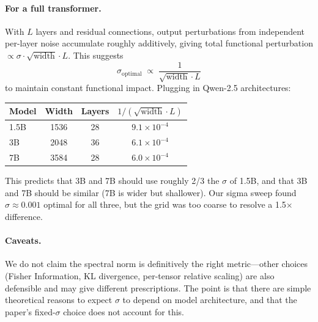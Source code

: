 \documentclass[11pt]{article}
\begin{document}
\paragraph{For a full transformer.} With $L$ layers and residual connections, output perturbations from independent per-layer noise accumulate roughly additively, giving total functional perturbation $\propto\sigma\cdot\sqrt{\text{width}}\cdot L$. This suggests
\[
  \sigma_{\text{optimal}} \;\propto\; \frac{1}{\sqrt{\text{width}}\cdot L}
\]
to maintain constant functional impact. Plugging in Qwen-2.5 architectures:

\begin{center}
\small
\begin{tabular}{lccc}
\toprule
Model & Width & Layers & $1/(\sqrt{\text{width}}\cdot L)$ \\
\midrule
1.5B & 1536 & 28 & $9.1\times 10^{-4}$ \\
3B   & 2048 & 36 & $6.1\times 10^{-4}$ \\
7B   & 3584 & 28 & $6.0\times 10^{-4}$ \\
\bottomrule
\end{tabular}
\end{center}

This predicts that 3B and 7B should use roughly 2/3 the $\sigma$ of 1.5B, and that 3B and 7B should be similar (7B is wider but shallower). Our sigma sweep found $\sigma\approx 0.001$ optimal for all three, but the grid was too coarse to resolve a 1.5$\times$ difference.

\paragraph{Caveats.} We do not claim the spectral norm is definitively the right metric---other choices (Fisher Information, KL divergence, per-tensor relative scaling) are also defensible and may give different prescriptions. The point is that there are simple theoretical reasons to expect $\sigma$ to depend on model architecture, and that the paper's fixed-$\sigma$ choice does not account for this.
\end{document}
